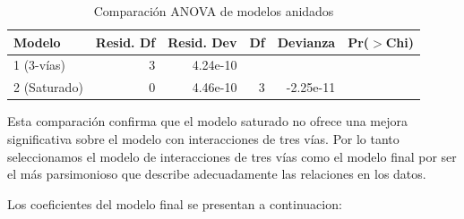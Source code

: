 \begin{table}[H]
\centering
\caption{Comparación ANOVA de modelos anidados}
\label{tab:anova}
\begin{tabular}{lrrrrr}
\toprule
\textbf{Modelo} & \textbf{Resid. Df} & \textbf{Resid. Dev} & \textbf{Df} & \textbf{Devianza} & \textbf{Pr($>$Chi)} \\
\midrule
1 (3-vías)      & 3                  & 4.24e-10            &             &                   &                     \\
2 (Saturado)    & 0                  & 4.46e-10            & 3           & -2.25e-11         &                     \\
\bottomrule
\end{tabular}
\end{table}

Esta comparación confirma que el modelo saturado no ofrece una mejora significativa sobre el modelo con interacciones de tres vías. Por lo tanto seleccionamos el modelo de interacciones de tres vías como el modelo final por ser el más parsimonioso que describe adecuadamente las relaciones en los datos.

Los coeficientes del modelo final se presentan a continuacion:  

\begin{table}[H]
\centering
\caption{Coeficientes del modelo de interacciones de tres vías}
\label{tab:coefs}
\end{table}

